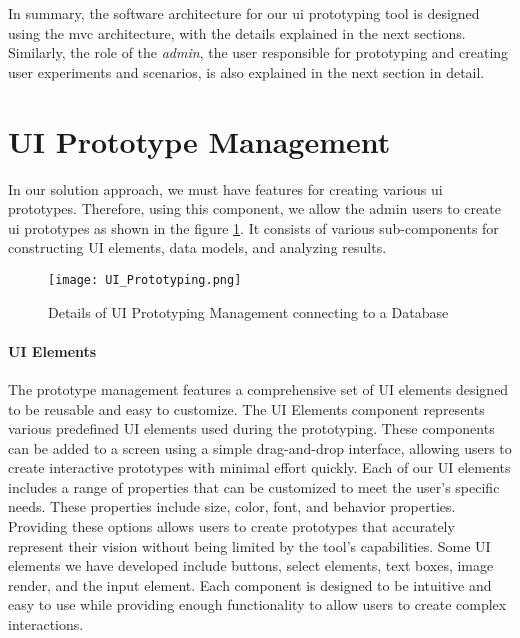 In summary, the software architecture for our \ac{ui} prototyping tool is designed using the \ac{mvc} architecture, with the details explained in the next sections. 
Similarly, the role of the \textit{admin}, the user responsible for prototyping and creating user experiments and scenarios, is also explained in the next section in detail.

\clearpage
\section{UI Prototype Management}
\label{sc:section:prototyping}
In our solution approach, we must have features for creating various \ac{ui} prototypes.
Therefore, using this component, we allow the admin users to create \ac{ui} prototypes as shown in the figure \ref{fig:sc:prototyping}.
It consists of various sub-components for constructing UI elements, data models, and analyzing results.
\begin{figure}[htbp!]
    \centering    
    \texttt{[image: UI\_Prototyping.png]} 
    \caption[Details of UI Prototyping Management]{Details of UI Prototyping Management connecting to a Database}
    \label{fig:sc:prototyping}
\end{figure}

\paragraph{UI Elements}
The prototype management features a comprehensive set of UI elements designed to be reusable and easy to customize. 
The UI Elements component represents various predefined UI elements used during the prototyping. 
These components can be added to a screen using a simple drag-and-drop interface, allowing users to create interactive prototypes with minimal effort quickly.
Each of our UI elements includes a range of properties that can be customized to meet the user's specific needs. 
These properties include size, color, font, and behavior properties. 
Providing these options allows users to create prototypes that accurately represent their vision without being limited by the tool's capabilities.
Some UI elements we have developed include buttons, select elements, text boxes, image render, and the input element. 
Each component is designed to be intuitive and easy to use while providing enough functionality to allow users to create complex interactions. 

